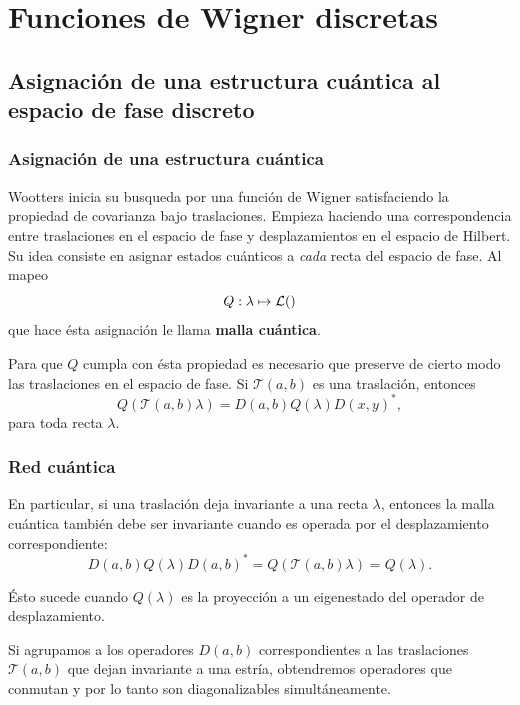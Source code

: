 \documentclass[10pt]{beamer}
\let\H\relax
\DeclareMathOperator{\H}{\mathcal H}
\begin{document}
  \section{Funciones de Wigner discretas}

  \subsection{Asignación de una estructura cuántica al
  espacio de fase discreto}

  \begin{frame}
    \frametitle{Asignación de una estructura cuántica}

    Wootters inicia su busqueda por una función de Wigner
    satisfaciendo la propiedad de covarianza bajo
    traslaciones. Empieza haciendo una correspondencia entre
    traslaciones en el espacio de fase y desplazamientos en
    el espacio de Hilbert. Su idea consiste en asignar
    estados cuánticos a \textit{cada} recta del espacio de
    fase. Al mapeo 
    \[
      Q : \lambda \mapsto \mathcal L(\H)
    \]
    que hace ésta asignación le llama
    \textbf{malla cuántica}.

    \vspace{10pt}

    \pause

    Para que $Q$ cumpla con ésta propiedad es necesario que
    preserve de cierto modo las traslaciones en el espacio
    de fase. Si $\mathcal T(a,b)$ es una traslación,
    entonces
    \begin{equation}
      Q\left( \mathcal T(a,b) \lambda \right) 
      =
      D(a,b) Q(\lambda) D(x,y)^{*},
    \end{equation}
    para toda recta $\lambda$.
  \end{frame}

  \begin{frame}
    \frametitle{Red cuántica}

    En particular, si una traslación deja invariante a una
    recta $\lambda$, entonces la malla cuántica también debe
    ser invariante cuando es operada por el desplazamiento
    correspondiente:
    \begin{equation}
      D(a,b) Q(\lambda) D(a,b)^{*}
      = Q(\mathcal T(a,b) \lambda)
      = Q(\lambda).
    \end{equation}

    Ésto sucede cuando $Q(\lambda)$ es la proyección a un
    eigenestado del operador de desplazamiento.

    \vspace{10pt}

    \pause

    Si agrupamos a los operadores $D(a,b)$ correspondientes
    a las traslaciones $\mathcal T(a,b)$ que dejan
    invariante a una estría, obtendremos operadores que
    conmutan y por lo tanto son diagonalizables
    simultáneamente. 
  \end{frame}
\end{document}
